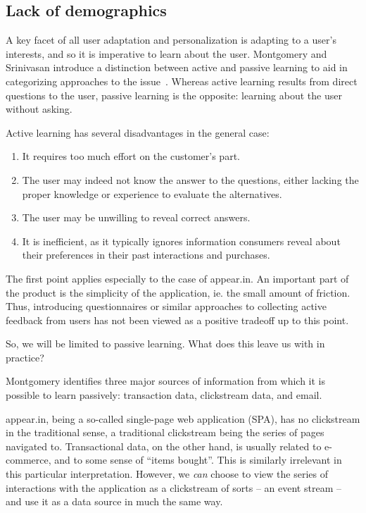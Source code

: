   \subsection{Lack of demographics}
  \label{survey:lack_of_demographics}

    A key facet of all user adaptation and personalization is adapting to a user's interests, and so it is imperative to learn about the user. Montgomery and Srinivasan introduce a distinction between active and passive learning to aid in categorizing approaches to the issue~\cite{Montgomery2002}. Whereas active learning results from direct questions to the user, passive learning is the opposite: learning about the user without asking.

    Active learning has several disadvantages in the general case:

    \begin{enumerate}
      \item It requires too much effort on the customer's part.
      \item The user may indeed not know the answer to the questions, either lacking the proper knowledge or experience to evaluate the alternatives.
      \item The user may be unwilling to reveal correct answers.
      \item It is inefficient, as it typically ignores information consumers reveal about their preferences in their past interactions and purchases.
    \end{enumerate}

    The first point applies especially to the case of appear.in. An important part of the product is the simplicity of the application, ie. the small amount of friction. Thus, introducing questionnaires or similar approaches to collecting active feedback from users has not been viewed as a positive tradeoff up to this point.

    So, we will be limited to passive learning. What does this leave us with in practice?

    Montgomery identifies three major sources of information from which it is possible to learn passively: transaction data, clickstream data, and email.

    appear.in, being a so-called single-page web application (SPA), has no clickstream in the traditional sense, a traditional clickstream being the series of pages navigated to. Transactional data, on the other hand, is usually related to e-commerce, and to some sense of ``items bought''. This is similarly irrelevant in this particular interpretation. However, we \emph{can} choose to view the series of interactions with the application as a clickstream of sorts -- an event stream -- and use it as a data source in much the same way.

